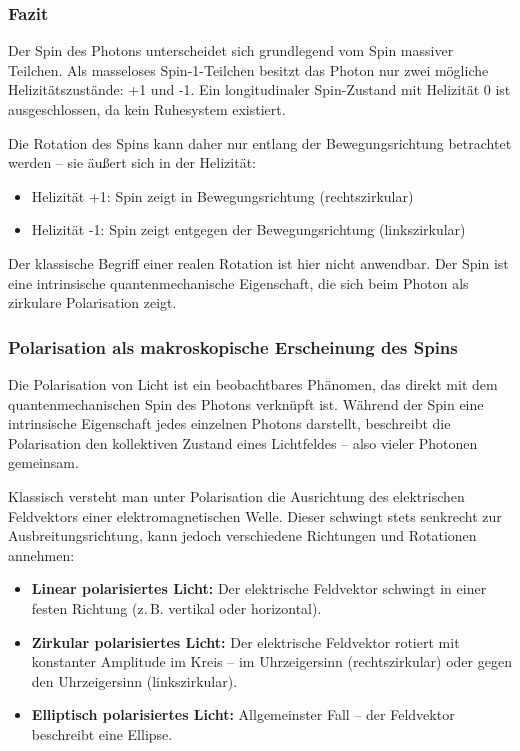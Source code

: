 \subsubsection*{Fazit}
Der Spin des Photons unterscheidet sich grundlegend vom Spin massiver Teilchen. Als masseloses Spin-1-Teilchen besitzt das Photon nur zwei mögliche Helizitätszustände: +1 und -1. Ein longitudinaler Spin-Zustand mit Helizität 0 ist ausgeschlossen, da kein Ruhesystem existiert.

\vspace{0.5em}
Die Rotation des Spins kann daher nur entlang der Bewegungsrichtung betrachtet werden – sie äußert sich in der Helizität:

\begin{itemize}
	\item Helizität +1: Spin zeigt in Bewegungsrichtung (rechtszirkular)
	\item Helizität -1: Spin zeigt entgegen der Bewegungsrichtung (linkszirkular)
\end{itemize}

Der klassische Begriff einer realen Rotation ist hier nicht anwendbar. Der Spin ist eine intrinsische quantenmechanische Eigenschaft, die sich beim Photon als zirkulare Polarisation zeigt.

\subsubsection{Polarisation als makroskopische Erscheinung  des Spins}

Die Polarisation von Licht ist ein beobachtbares Phänomen, das direkt mit dem quantenmechanischen Spin des Photons verknüpft ist. Während der Spin eine intrinsische Eigenschaft jedes einzelnen Photons darstellt, beschreibt die Polarisation den kollektiven Zustand eines Lichtfeldes – also vieler Photonen gemeinsam.

\vspace{0.5em}
Klassisch versteht man unter Polarisation die Ausrichtung des elektrischen Feldvektors einer elektromagnetischen Welle. Dieser schwingt stets senkrecht zur Ausbreitungsrichtung, kann jedoch verschiedene Richtungen und Rotationen annehmen:

\begin{itemize}
	\item \textbf{Linear polarisiertes Licht:} Der elektrische Feldvektor schwingt in einer festen Richtung (z.\,B. vertikal oder horizontal).
	\item \textbf{Zirkular polarisiertes Licht:} Der elektrische Feldvektor rotiert mit konstanter Amplitude im Kreis – im Uhrzeigersinn (rechtszirkular) oder gegen den Uhrzeigersinn (linkszirkular).
	\item \textbf{Elliptisch polarisiertes Licht:} Allgemeinster Fall – der Feldvektor beschreibt eine Ellipse.
\end{itemize}


